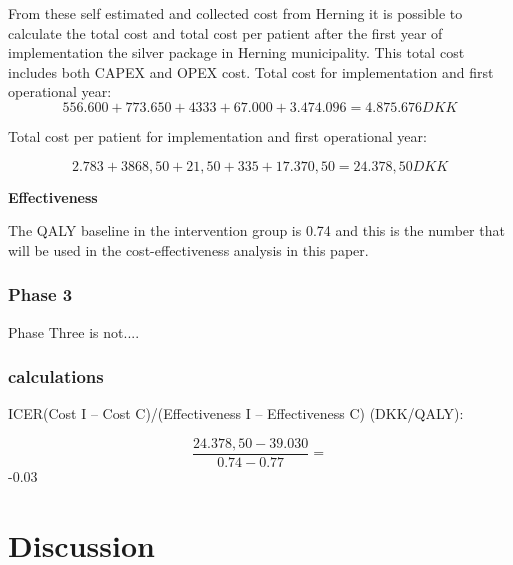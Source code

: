 From these self estimated and collected cost from Herning it is possible to calculate the total cost and total cost per patient after the first year of implementation the silver package in Herning municipality. This total cost includes both CAPEX and OPEX cost.
Total cost for implementation and first operational year:
$$556.600 + 773.650 + 4333 + 67.000 + 3.474.096 = 4.875.676DKK$$

Total cost per patient for implementation and first operational year:

$$2.783+3868,50+21,50+335+17.370,50= 24.378,50DKK$$

\textbf{Effectiveness}

The QALY baseline in the intervention group is 0.74 and this is the number that will be used in the cost-effectiveness analysis in this paper\cite{costeffect}. 

\subsection{Phase 3}

Phase Three is not....


\subsection{calculations}
ICER(Cost I – Cost C)/(Effectiveness I – Effectiveness C) (DKK/QALY):

$$\frac{24.378,50-39.030}{0.74-0.77}=$$ -0.03

\chapter{Discussion}

